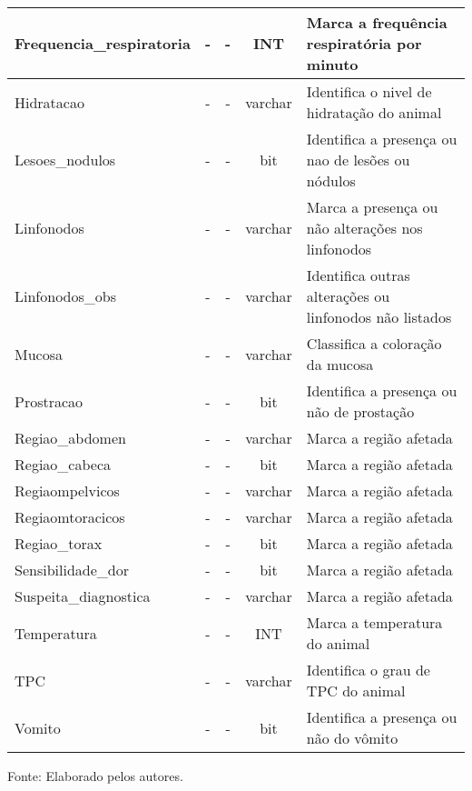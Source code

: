 \documentclass[
    12pt,               %
    openright,          %
    oneside,
    a4paper,            %
    BIBLATEX,           %
    TODO,               %
    english,            %
    brazil              %
    ]{ifsp-spo-inf-ctds}
\begin{document}
\begin{center}
\begin{quadro}[H]
\begin{tabulary}{1.0\textwidth}{|p{11em}|c|c|c|p{17em}|}
                  \hline
                  Frequencia\_respiratoria & - & - & INT & Marca a frequência respiratória por minuto\\
                  \hline
                  Hidratacao & - & - & varchar & Identifica o nivel de hidratação do animal\\
                  \hline
                  Lesoes\_nodulos & - & - & bit & Identifica a presença ou nao de lesões ou nódulos\\
                  \hline
                  Linfonodos & - & - & varchar & Marca a presença ou não alterações nos linfonodos\\
                  \hline
                  Linfonodos\_obs & - & - & varchar & Identifica outras alterações ou linfonodos não listados\\
                  \hline
                  Mucosa & - & - & varchar & Classifica a coloração da mucosa\\
                  \hline
                  Prostracao & - & - & bit & Identifica a presença ou não de prostação\\
                  \hline
                  Regiao\_abdomen & - & - & varchar & Marca a região afetada\\
                  \hline
                  Regiao\_cabeca & - & - & bit & Marca a região afetada\\
                  \hline
                  Regiaompelvicos & - & - & varchar & Marca a região afetada\\
                  \hline
                  Regiaomtoracicos & - & - & varchar & Marca a região afetada\\
                  \hline
                  Regiao\_torax & - & - & bit & Marca a região afetada\\
                  \hline
                  Sensibilidade\_dor & - & - & bit & Marca a região afetada\\
                  \hline
                  Suspeita\_diagnostica & - & - & varchar & Marca a região afetada\\
                  \hline
                  Temperatura & - & - & INT & Marca a temperatura do animal\\
                  \hline
                  TPC & - & - & varchar & Identifica o grau de TPC do animal\\
                  \hline
                  Vomito & - & - & bit & Identifica a presença ou não do vômito\\
                  \hline
                  \end{tabulary}
                  \label{qd: md-prontuario}
                  \centering
                  \footnotesize Fonte: Elaborado pelos autores.
                \end{quadro}
            \end{center} 
\end{document}
